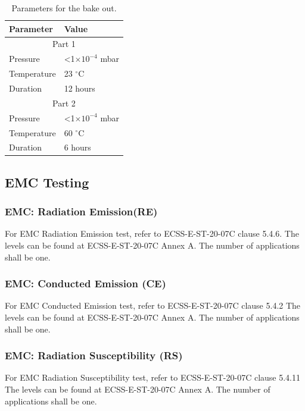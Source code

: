 \begin{table}[!htb]
\caption{Parameters for the bake out.}
\centering
\begin{tabular}{|l|l|}\hline
		Parameter & Value  \\ \hline
	    \multicolumn{2}{|c|}{Part 1}  \\ \hline
	    Pressure           & <1$\times 10^{-4}$ mbar \\ \hline
	    Temperature        & 23 $^\circ$C \\ \hline
        Duration           & 12 hours               \\ \hline
	  \multicolumn{2}{|c|}{Part 2}               \\ \hline
	  Pressure           & <1$\times 10^{-4}$ mbar          \\ \hline
	  Temperature        & 60 $^\circ$C      \\ \hline
	  Duration           & 6 hours  \\ \hline
	    \end{tabular}
     \label{tab:bakeout_cycling}
\end{table}

\subsection{EMC Testing}


\subsubsection{EMC: Radiation Emission(RE)}
For EMC Radiation Emission test, refer to ECSS-E-ST-20-07C clause 5.4.6. The levels
can be found at ECSS-E-ST-20-07C Annex A. The number of applications shall be one.

\subsubsection{EMC: Conducted Emission (CE)}
For EMC Conducted Emission test, refer to ECSS-E-ST-20-07C clause 5.4.2 The levels
can be found at ECSS-E-ST-20-07C Annex A. The number of applications shall be one.

\subsubsection{EMC: Radiation Susceptibility (RS)}
For EMC Radiation Susceptibility test, refer to ECSS-E-ST-20-07C clause 5.4.11 The
levels can be found at ECSS-E-ST-20-07C Annex A. The number of applications shall be one.

